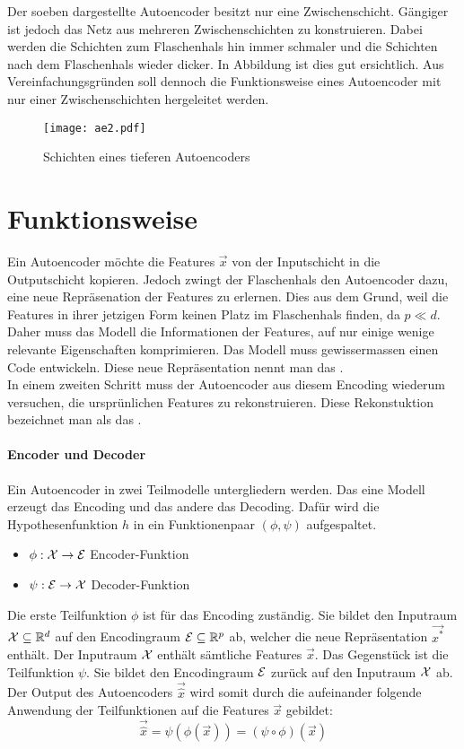 \para{}
Der soeben dargestellte Autoencoder besitzt nur eine Zwischenschicht.
Gängiger ist jedoch das Netz aus mehreren Zwischenschichten zu konstruieren. Dabei
werden die Schichten zum Flaschenhals hin immer schmaler und die Schichten nach
dem Flaschenhals wieder dicker. In Abbildung 
ist dies gut ersichtlich.
Aus Vereinfachungsgründen soll dennoch die Funktionsweise eines Autoencoder mit
nur einer Zwischenschichten hergeleitet werden.
\para{}
\begin{figure}[h!]
  \centering
  \texttt{[image: ae2.pdf]}
  \caption{Schichten eines tieferen Autoencoders}
  \label{fig:big_autoencoder}
\end{figure}

\section{Funktionsweise}
Ein Autoencoder möchte die Features $\vec{x}$ von der Inputschicht in die
Outputschicht kopieren. Jedoch zwingt der Flaschenhals den Autoencoder dazu, eine
neue Repräsenation der Features zu erlernen. Dies aus dem Grund, weil die
Features in ihrer jetzigen Form keinen Platz im Flaschenhals finden, da $p \ll d$.
Daher muss das Modell die Informationen der Features,
auf nur einige wenige relevante Eigenschaften komprimieren.
Das Modell muss gewissermassen einen Code entwickeln.
Diese neue Repräsentation nennt man das . \\
In einem zweiten Schritt muss der Autoencoder aus diesem Encoding wiederum
versuchen, die ursprünlichen Features zu rekonstruieren. Diese Rekonstuktion
bezeichnet man als das .

\paragraph{Encoder und Decoder}
Ein Autoencoder in zwei Teilmodelle untergliedern werden. Das
eine Modell erzeugt das Encoding und das andere das Decoding. Dafür wird
die Hypothesenfunktion $h$ in ein Funktionenpaar $(\phi,\psi)$ aufgespaltet.
\begin{itemize}
\item{$\phi: \mathcal{X} \to \mathcal{E}$ Encoder-Funktion}
\item{$\psi: \mathcal{E} \to \mathcal{X}$ Decoder-Funktion}
\end{itemize}
Die erste Teilfunktion $\phi$ ist für das Encoding zuständig. Sie
bildet den Inputraum $\mathcal{X} \subseteq \mathbb{R}^d$ auf
den Encodingraum $\mathcal{E} \subseteq \mathbb{R}^p$ ab, welcher die neue
Repräsentation $\vec{x^*}$ enthält. Der Inputraum $\mathcal{X}$ enthält
sämtliche Features $\vec{x}$.
\para{}
Das Gegenstück ist die Teilfunktion $\psi$. Sie bildet den Encodingraum
$\mathcal{E}$ zurück auf den Inputraum $\mathcal{X}$ ab.
\para{}
Der Output des Autoencoders $\vec{\hat{x}}$ wird somit durch die aufeinander
folgende Anwendung der Teilfunktionen auf die Features $\vec{x}$ gebildet:
\begin{equation}
  \vec{\hat{x}} = \psi(\phi(\vec{x})) = (\psi \circ \phi)(\vec{x})
\end{equation}

